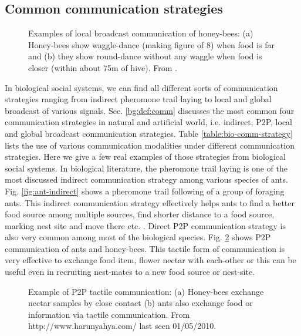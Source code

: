 \subsection{Common communication strategies}
\label{bg:bio-comm:strategies}
\begin{figure}
\centering
{} 
\hspace{0.25cm}
\caption{Examples of local broadcast communication of honey-bees: (a) Honey-bees show waggle-dance (making figure of 8) when food is far and (b) they show round-dance without any waggle when food is closer (within about 75m of hive). From \protect{}.}
\label{fig:honey-bee-dances}
\end{figure}
In biological social systems, we can find all different sorts of communication strategies ranging from indirect pheromone trail laying to local and global broadcast of various signals. Sec. \ref{bg:def:comm} discusses the most common four communication strategies in natural and artificial world, i.e. indirect, P2P, local and global broadcast communication strategies. Table \ref{table:bio-comm-strategy} lists the use of various communication modalities under different communication strategies. Here we give a few real examples of those strategies from biological social systems. In biological literature, the pheromone trail laying is one of the most discussed indirect communication strategy among various species of ants. Fig. \ref{fig:ant-indirect} shows a pheromone trail following of a group of foraging ants. This indirect communication strategy effectively helps ants to find a better food source among multiple sources, find shorter distance to a food source, marking nest site and move there etc. \cite{Hughes2008}. Direct P2P communication strategy is also very common among most of the biological species. Fig. \ref{fig:bees-ants-p2p-comm} shows P2P communication of ants and honey-bees. This tactile form of communication is very effective to exchange food item, flower nectar with each-other or this can be useful even in recruiting nest-mates to a new food source or nest-site.
\begin{figure}
\centering
{} 
\hspace{0.25cm}
\caption{Example of P2P tactile communication: (a) Honey-bees exchange nectar samples by close contact (b) ants also exchange food or information via tactile communication. \protect\newline  From http://www.harunyahya.com/ last seen 01/05/2010.}
\label{fig:bees-ants-p2p-comm}
\end{figure}

